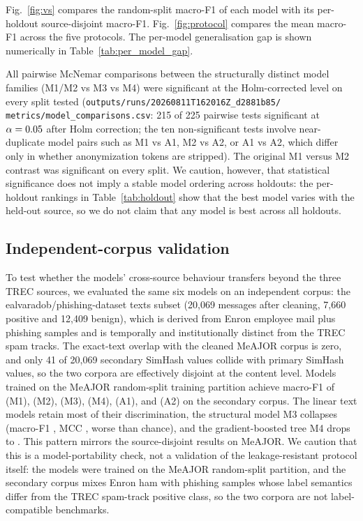 \documentclass[conference]{IEEEtran}
\begin{document}
Fig.~\ref{fig:vs} compares the random-split macro-F1 of each model with its per-holdout source-disjoint macro-F1. Fig.~\ref{fig:protocol} compares the mean macro-F1 across the five protocols. The per-model generalisation gap is shown numerically in Table~\ref{tab:per_model_gap}.

All pairwise McNemar comparisons between the structurally distinct model families (M1/M2 vs M3 vs M4) were significant at the Holm-corrected level on every split tested (\texttt{outputs/runs/20260811T162016Z\_d2881b85/\\metrics/model\_comparisons.csv}: 215 of 225 pairwise tests significant at $\alpha=0.05$ after Holm correction; the ten non-significant tests involve near-duplicate model pairs such as M1 vs A1, M2 vs A2, or A1 vs A2, which differ only in whether anonymization tokens are stripped). The original M1 versus M2 contrast was significant on every split. We caution, however, that statistical significance does not imply a stable model ordering across holdouts: the per-holdout rankings in Table~\ref{tab:holdout} show that the best model varies with the held-out source, so we do not claim that any model is best across all holdouts.

\subsection{Independent-corpus validation}
To test whether the models' cross-source behaviour transfers beyond the three TREC sources, we evaluated the same six models on an independent corpus: the ealvaradob/phishing-dataset texts subset (20,069 messages after cleaning, 7,660 positive and 12,409 benign), which is derived from Enron employee mail plus phishing samples and is temporally and institutionally distinct from the TREC spam tracks. The exact-text overlap with the cleaned MeAJOR corpus is zero, and only 41 of 20,069 secondary SimHash values collide with primary SimHash values, so the two corpora are effectively disjoint at the content level. Models trained on the MeAJOR random-split training partition achieve macro-F1 of \SecFMOne{} (M1), \SecFMTwo{} (M2), \SecFMThree{} (M3), \SecFMFour{} (M4), \SecFAOne{} (A1), and \SecFATwo{} (A2) on the secondary corpus. The linear text models retain most of their discrimination, the structural model M3 collapses (macro-F1 \SecFMThree{}, MCC \SecMThreeMCC{}, worse than chance), and the gradient-boosted tree M4 drops to \SecFMFour{}. This pattern mirrors the source-disjoint results on MeAJOR. We caution that this is a model-portability check, not a validation of the leakage-resistant protocol itself: the models were trained on the MeAJOR random-split partition, and the secondary corpus mixes Enron ham with phishing samples whose label semantics differ from the TREC spam-track positive class, so the two corpora are not label-compatible benchmarks.
\end{document}
